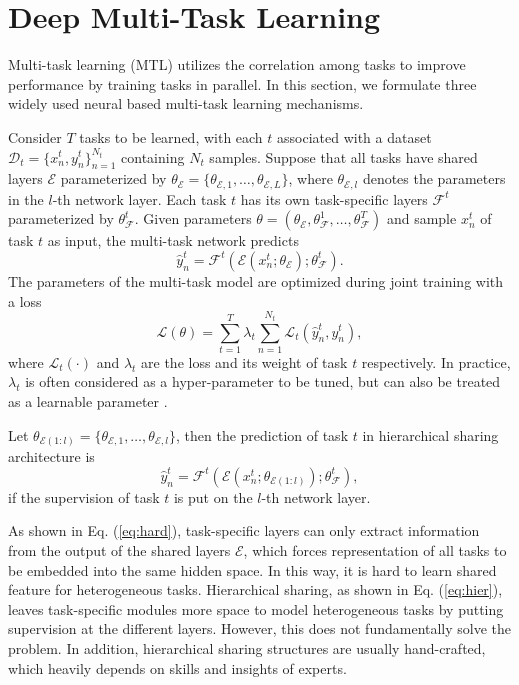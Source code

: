 \documentclass[letterpaper]{article} %
\begin{document}
\section{Deep Multi-Task Learning}
Multi-task learning (MTL) utilizes the correlation among tasks to improve performance by training tasks in parallel. In this section, we formulate three widely used neural based multi-task learning mechanisms.

Consider $T$ tasks to be learned, with each $t$ associated with a dataset $\mathcal{D}_t=\{x_n^{t}, y_n^{t}\}_{n=1}^{N_t}$ containing $N_t$ samples. Suppose that all tasks have shared layers $\mathcal{E}$ parameterized by $\theta_{\mathcal{E}}=\{\theta_{\mathcal{E}, 1},\dots,\theta_{\mathcal{E}, L}\}$, where $\theta_{\mathcal{E}, l}$ denotes the parameters in the $l$-th network layer. Each task $t$ has its own task-specific layers $\mathcal{F}^t$ parameterized by $\theta_{\mathcal{F}}^t$. Given parameters $\theta=(\theta_\mathcal{E}, \theta_{\mathcal{F}}^1, \dots, \theta_{\mathcal{F}}^T)$ and sample $x_n^t$ of task $t$ as input, the multi-task network predicts
\begin{equation}\label{eq:hard}
\hat{y}_n^t = \mathcal{F}^t(\mathcal{E}(x_n^t; \theta_\mathcal{E}); \theta_\mathcal{F}^t).
\end{equation}
The parameters of the multi-task model are optimized during joint training with a loss
\begin{equation}
\mathcal{L}(\theta) = \sum_{t=1}^T\lambda_t\sum_{n=1}^{N_t}\mathcal{L}_t(\hat{y}_n^t, y_n^t),
\end{equation}
where $\mathcal{L}_t(\cdot)$ and $\lambda_t$ are the loss and its weight of task $t$ respectively. In practice, $\lambda_t$ is often considered as a hyper-parameter to be tuned, but can also be treated as a learnable parameter \cite{DBLP:conf/cvpr/KendallGC18}.

Let $\theta_{\mathcal{E}(1:l)} = \{\theta_{\mathcal{E}, 1},\dots,\theta_{\mathcal{E}, l}\}$, then the prediction of task $t$ in hierarchical sharing architecture is
\begin{equation}\label{eq:hier}
\hat{y}_n^t = \mathcal{F}^t(\mathcal{E}(x_n^t; \theta_{\mathcal{E}(1:l)}); \theta_\mathcal{F}^t),
\end{equation}
if the supervision of task $t$ is put on the $l$-th network layer.

As shown in Eq. (\ref{eq:hard}), task-specific layers can only extract information from the output of the shared layers $\mathcal{E}$, which forces representation of all tasks to be embedded into the same hidden space. In this way, it is hard to learn shared feature for heterogeneous tasks. Hierarchical sharing, as shown in Eq. (\ref{eq:hier}), leaves task-specific modules more space to model heterogeneous tasks by putting supervision at the different layers. However, this does not fundamentally solve the problem. In addition, hierarchical sharing structures are usually hand-crafted, which heavily depends on skills and insights of experts.
\end{document}

